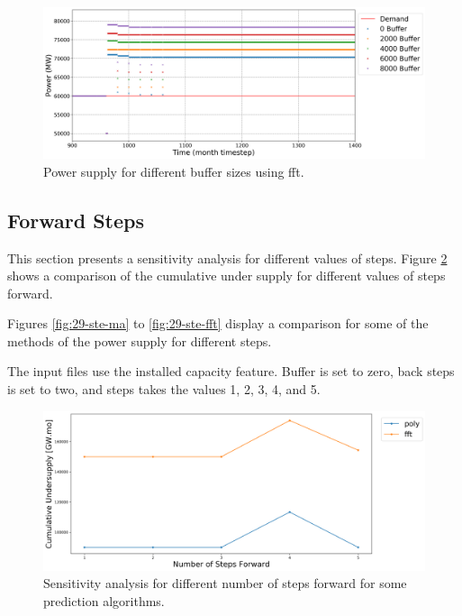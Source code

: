 \documentclass[11pt]{article}
\begin{document}
\begin{figure}[H]
	\centering
	\includegraphics[width=\textwidth]{29-figures/29-power-buffer-fft.png} 
	\hfill
	\caption{Power supply for different buffer sizes using fft.}
	\label{fig:29-buf-fft}
\end{figure}

\subsection{Forward Steps}

This section presents a sensitivity analysis for different values of steps.
Figure \ref{fig:29-steps} shows a comparison of the cumulative under supply for different values of steps forward.

Figures \ref{fig:29-ste-ma} to \ref{fig:29-ste-fft} display a comparison for some of the methods of the power supply for different steps.

The input files use the installed capacity feature. Buffer is set to zero, back steps is set to two, and steps takes the values 1, 2, 3, 4, and 5.

\begin{figure}[H]
	\centering
	\includegraphics[width=\textwidth]{29-figures/29-sens-steps.png} 
	\hfill
	\caption{Sensitivity analysis for different number of steps forward for some prediction algorithms.}
	\label{fig:29-steps}
\end{figure}
\end{document}
